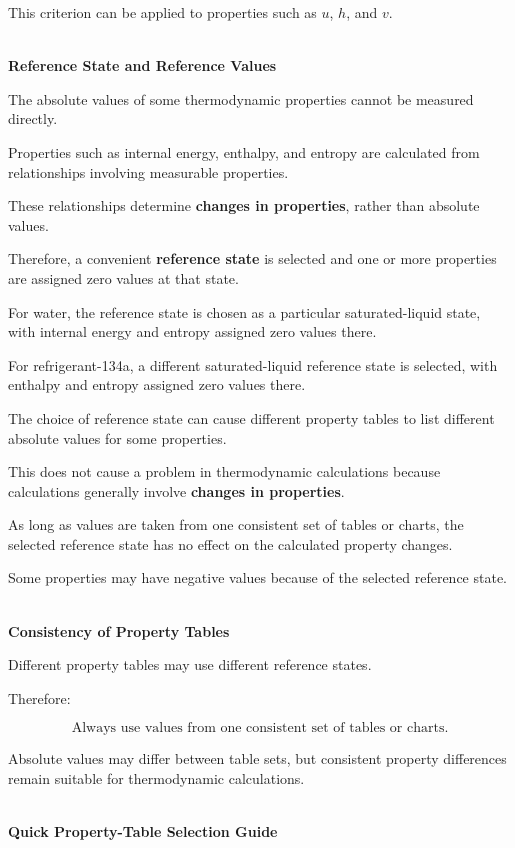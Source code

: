 \documentclass[12pt]{article}
\begin{document}
This criterion can be applied to properties such as $u$, $h$, and $v$.

\textbf{\\ Reference State and Reference Values}

The absolute values of some thermodynamic properties cannot be measured directly.

Properties such as internal energy, enthalpy, and entropy are calculated from relationships involving measurable properties.

These relationships determine \textbf{changes in properties}, rather than absolute values.

Therefore, a convenient \textbf{reference state} is selected and one or more properties are assigned zero values at that state.

For water, the reference state is chosen as a particular saturated-liquid state, with internal energy and entropy assigned zero values there.

For refrigerant-134a, a different saturated-liquid reference state is selected, with enthalpy and entropy assigned zero values there.

The choice of reference state can cause different property tables to list different absolute values for some properties.

This does not cause a problem in thermodynamic calculations because calculations generally involve \textbf{changes in properties}.

As long as values are taken from one consistent set of tables or charts, the selected reference state has no effect on the calculated property changes.

Some properties may have negative values because of the selected reference state.

\textbf{\\ Consistency of Property Tables}

Different property tables may use different reference states.

Therefore:

\begin{equation*}
\boxed{
\text{Always use values from one consistent set of tables or charts.}
}
\end{equation*}

Absolute values may differ between table sets, but consistent property differences remain suitable for thermodynamic calculations.

\textbf{\\ Quick Property-Table Selection Guide}
\end{document}
